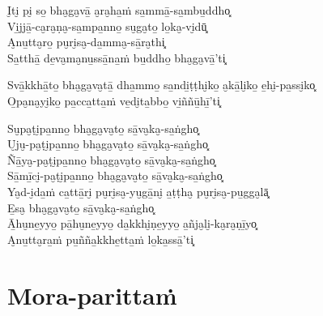 \begin{paritta}
I̮ti̮ pi̮ so̱ bha̮ga̮vā̱ a̮ra̮ha̱ṁ sa̱mmā̱-sa̱mbu̱ddho͓\\
Vi̱jjā̱-ca̮ra̮ṇa̮-sa̱mpa̱nno̱ su̮ga̮to̱ lo̱ka̮-vi̮dū͓\\
A̮nu̱tta̮ro̱ pu̮ri̮sa̮-da̱mma̮-sā̱ra̮thi͓\\
Sa̱tthā̱ de̱va̮ma̮nu̱ssā̱na̱ṁ bu̱ddho̱ bha̮ga̮vā̱'ti͓

Svā̱kkhā̱to̱ bha̮ga̮va̮tā̱ dha̱mmo̱ sa̱ndi̱ṭṭhi̮ko̱ a̮kā̱li̮ko̱ e̱hi̮-pa̱ssi̮ko͓\\
O̱pa̮na̮yi̮ko̱ pa̱cca̱tta̱ṁ ve̱di̮ta̱bbo̱ vi̱ññū̱hī̱'ti͓

Su̮pa̮ṭi̮pa̱nno̱ bha̮ga̮va̮to̱ sā̱va̮ka̮-sa̱ṅgho͓\\
U̮ju̮-pa̮ṭi̮pa̱nno̱ bha̮ga̮va̮to̱ sā̱va̮ka̮-sa̱ṅgho͓\\
Ñā̱ya̮-pa̮ṭi̮pa̱nno̱ bha̮ga̮va̮to̱ sā̱va̮ka̮-sa̱ṅgho͓\\
Sā̱mī̱ci̮-pa̮ṭi̮pa̱nno̱ bha̮ga̮va̮to̱ sā̱va̮ka̮-sa̱ṅgho͓\\
Ya̮d-i̮da̱ṁ ca̱ttā̱ri̮ pu̮ri̮sa̮-yu̮gā̱ni̮ a̱ṭṭha̮ pu̮ri̮sa̮-pu̱gga̮lā͓\\
E̱sa̮ bha̮ga̮va̮to̱ sā̱va̮ka̮-sa̱ṅgho͓\\
Ā̱hu̮ne̱yyo̱ pā̱hu̮ne̱yyo̱ da̱kkhi̮ṇe̱yyo̱ a̱ñja̮li̮-ka̮ra̮ṇī̱yo͓\\
A̮nu̱tta̮ra̱ṁ pu̱ñña̱kkhe̱tta̱ṁ lo̱ka̱ssā̱'ti͓
\end{paritta}

\clearpage

\chapter{Mora-parittaṁ}


